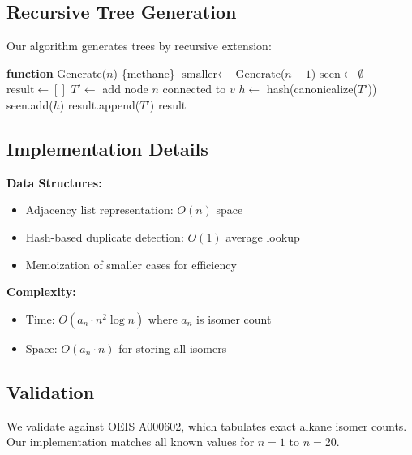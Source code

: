 \documentclass[conference]{IEEEtran}
\begin{document}
\subsection{Recursive Tree Generation}

Our algorithm generates trees by recursive extension:

\begin{algorithm}
\caption{Generate Alkane Isomers}
\begin{algorithmic}[1]
\STATE \textbf{function} Generate($n$)
    \RETURN \{methane\}
\ENDIF
\STATE $\text{smaller} \gets$ Generate($n-1$)
\STATE $\text{seen} \gets \emptyset$
\STATE $\text{result} \gets []$
        \STATE $T' \gets$ add node $n$ connected to $v$
        \STATE $h \gets$ hash(canonicalize($T'$))
            \STATE seen.add($h$)
            \STATE result.append($T'$)
        \ENDIF
    \ENDFOR
\ENDFOR
\RETURN result
\end{algorithmic}
\end{algorithm}

\subsection{Implementation Details}

\textbf{Data Structures:}
\begin{itemize}
    \item Adjacency list representation: $O(n)$ space
    \item Hash-based duplicate detection: $O(1)$ average lookup
    \item Memoization of smaller cases for efficiency
\end{itemize}

\textbf{Complexity:}
\begin{itemize}
    \item Time: $O(a_n \cdot n^2 \log n)$ where $a_n$ is isomer count
    \item Space: $O(a_n \cdot n)$ for storing all isomers
\end{itemize}

\subsection{Validation}

We validate against OEIS A000602, which tabulates exact alkane isomer counts. Our implementation matches all known values for $n = 1$ to $n = 20$.
\end{document}

